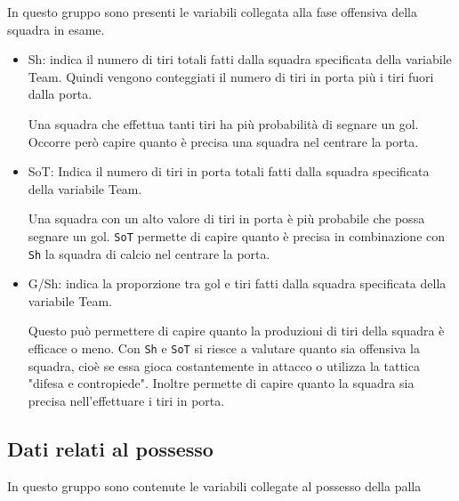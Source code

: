 In questo gruppo sono presenti le variabili collegata alla fase offensiva della squadra in esame.

\begin{itemize}
	
	\item \textsf{Sh}: indica il numero di tiri totali fatti dalla squadra specificata della variabile \textsf{Team}. Quindi vengono conteggiati il numero di tiri in porta più i tiri fuori dalla porta. 
	
	Una squadra che effettua tanti tiri ha più probabilità di segnare un gol. Occorre però capire quanto è precisa una squadra nel centrare la porta.
	\item \textsf{SoT}: Indica il numero di tiri in porta totali fatti dalla squadra specificata della variabile \textsf{Team}. 
	
	Una squadra con un alto valore di tiri in porta è più probabile che possa segnare un gol. \texttt{SoT} permette di capire quanto è precisa in combinazione con \texttt{Sh} la squadra di calcio nel centrare la porta.
	\item \textsf{G/Sh}: indica la proporzione tra gol e tiri fatti dalla squadra specificata della variabile \textsf{Team}. 
	
	Questo può permettere di capire quanto la produzioni di tiri della squadra è efficace o meno. Con \texttt{Sh} e \texttt{SoT} si riesce a valutare quanto sia offensiva la squadra, cioè se essa gioca costantemente in attacco o utilizza la tattica "difesa e contropiede". Inoltre permette di capire quanto la squadra sia precisa nell'effettuare i tiri in porta.
\end{itemize}

\subsection{Dati relati al possesso}

In questo gruppo sono contenute le variabili collegate al possesso della palla 

